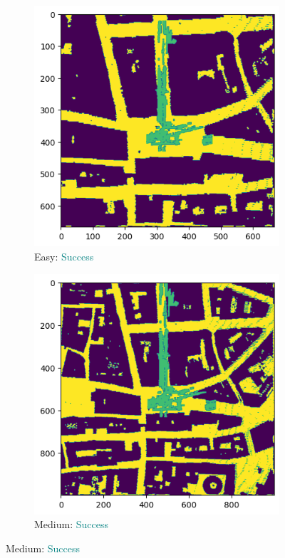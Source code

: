 \documentclass[11pt]{article}
\begin{document}
    \newpage
    \begin{figure}[p]
        \centering
        \begin{subfigure}{0.45\textwidth}
            \centering
            \includegraphics[width=\linewidth]{images/full/easy/4_1_3_easy}
            \caption{Easy: \textcolor{teal}{Success}}
            \label{fig:4_1_3_easy}
        \end{subfigure}
        \hfill
        \begin{subfigure}{0.45\textwidth}
            \centering
            \includegraphics[width=\linewidth]{images/full/medium/4_1_3_medium}
            \caption{Medium: \textcolor{teal}{Success}}
            \label{fig:4_1_3_medium}
        \end{subfigure}


\end{figure}
\end{document}
